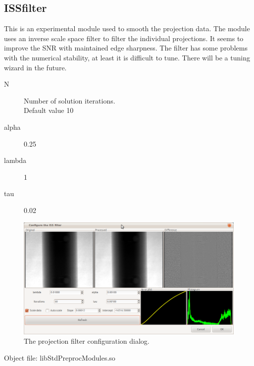 \documentclass[a4paper]{scrreprt}
\begin{document}
\subsection{ISSfilter}
This is an experimental module used to smooth the projection data. The module uses an inverse scale space filter \cite{burger2006} to filter the individual projections. It seems to improve the SNR with maintained edge sharpness. The filter has some problems with the numerical stability, at least it is difficult to tune. There will be a tuning wizard in the future.
\begin{description}
 \item[N] Number of solution iterations. \\ Default value 10
 \item[alpha]0.25
 \item[lambda]1
 \item[tau]0.02
\end{description}
\begin{figure}[ht!]
\centering
\includegraphics[scale=0.5]{figures/ConfISS.png}
\caption{The projection filter configuration dialog.}
\end{figure}
Object file: libStdPreprocModules.so
\end{document}
